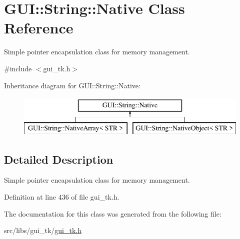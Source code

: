 \hypertarget{classGUI_1_1String_1_1Native}{\section{G\-U\-I\-:\-:String\-:\-:Native Class Reference}
\label{classGUI_1_1String_1_1Native}
}


Simple pointer encapsulation class for memory management.  




{\ttfamily \#include $<$gui\-\_\-tk.\-h$>$}

Inheritance diagram for G\-U\-I\-:\-:String\-:\-:Native\-:\begin{figure}[H]
\begin{center}
\leavevmode
\includegraphics[height=2.000000cm]{classGUI_1_1String_1_1Native}
\end{center}
\end{figure}


\subsection{Detailed Description}
Simple pointer encapsulation class for memory management. 

Definition at line 436 of file gui\-\_\-tk.\-h.



The documentation for this class was generated from the following file\-:\begin{DoxyCompactItemize}
\item 
src/libs/gui\-\_\-tk/\hyperlink{gui__tk_8h}{gui\-\_\-tk.\-h}\end{DoxyCompactItemize}
